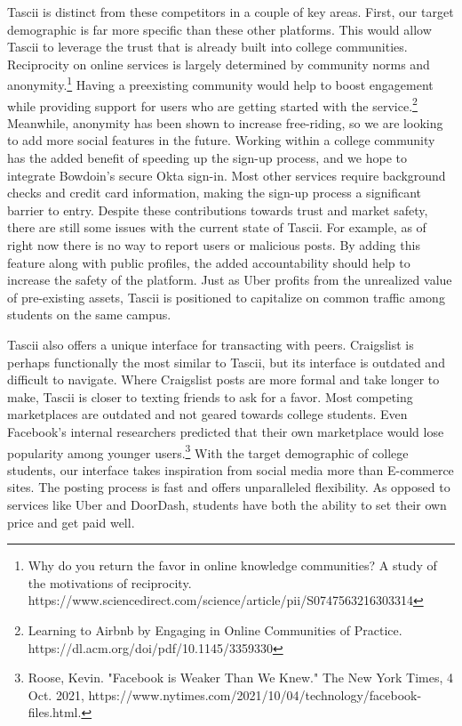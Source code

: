 Tascii is distinct from these competitors in a couple of key areas. First, our target demographic is far more specific than these other platforms. This would allow Tascii to leverage the trust that is already built into college communities. Reciprocity on online services is largely determined by community norms and anonymity.\footnote{Why do you return the favor in online knowledge communities? A study of the motivations of reciprocity. https://www.sciencedirect.com/science/article/pii/S0747563216303314} Having a preexisting community would help to boost engagement while providing support for users who are getting started with the service.\footnote{Learning to Airbnb by Engaging in Online Communities of Practice. https://dl.acm.org/doi/pdf/10.1145/3359330} Meanwhile, anonymity has been shown to increase free-riding, so we are looking to add more social features in the future. Working within a college community has the added benefit of speeding up the sign-up process, and we hope to integrate Bowdoin’s secure Okta sign-in. Most other services require background checks and credit card information, making the sign-up process a significant barrier to entry. Despite these contributions towards trust and market safety, there are still some issues with the current state of Tascii. For example, as of right now there is no way to report users or malicious posts. By adding this feature along with public profiles, the added accountability should help to increase the safety of the platform. Just as Uber profits from the unrealized value of pre-existing assets, Tascii is positioned to capitalize on common traffic among students on the same campus. 

Tascii also offers a unique interface for transacting with peers. Craigslist is perhaps functionally the most similar to Tascii, but its interface is outdated and difficult to navigate. Where Craigslist posts are more formal and take longer to make, Tascii is closer to texting friends to ask for a favor. Most competing marketplaces are outdated and not geared towards college students. Even Facebook's internal researchers predicted that their own marketplace would lose popularity among younger users.\footnote{ Roose, Kevin. "Facebook is Weaker Than We Knew." The New York Times, 4 Oct. 2021, https://www.nytimes.com/2021/10/04/technology/facebook-files.html.} With the target demographic of college students, our interface takes inspiration from social media more than E-commerce sites. The posting process is fast and offers unparalleled flexibility. As opposed to services like Uber and DoorDash, students have both the ability to set their own price and get paid well. 


